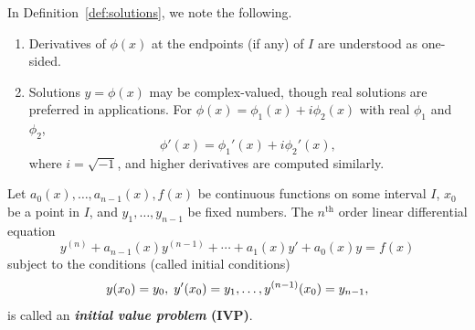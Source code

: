 
\begin{remark}
	In Definition~\ref{def:solutions}, we note the following.
	\begin{enumerate}[label=(\roman*), noitemsep]
		\item Derivatives of $\phi(x)$ at the endpoints (if any) of \(I\)  are understood as one-sided.
		\item Solutions $y = \phi(x)$ may be complex-valued, though real solutions are preferred in  applications. For $\phi(x) = \phi_1(x) + i \phi_2(x)$ with real $\phi_1$ and $\phi_2$, 
		\[
		\phi'(x) = \phi_1'(x) + i \phi_2'(x),
		\]
		where $i = \sqrt{-1}$, and higher derivatives are computed similarly.
	\end{enumerate}
\end{remark}



\begin{definition}
	Let   \( a_0(x), \dots, a_{n-1}(x), f(x) \)  be continuous functions on some interval \( I \), $x_0$ be a point in $I$, and $y_1,\dots, y_{n-1}$ be fixed numbers.  The $n^\text{th}$ order linear differential equation
\[
	y^{(n)} + a_{n-1}(x)y^{(n-1)} + \cdots + a_1(x)y' + a_0(x)y = f(x)
\]
subject to the conditions (called initial conditions) 
\[\\ y(x_0) = y_0,\;  y'(x_0) = y_1, \dots, y^{(n-1)}(x_0) = y_{n-1},\]
is called an \textbf{\textit{initial value problem} (IVP)}.
\end{definition}

